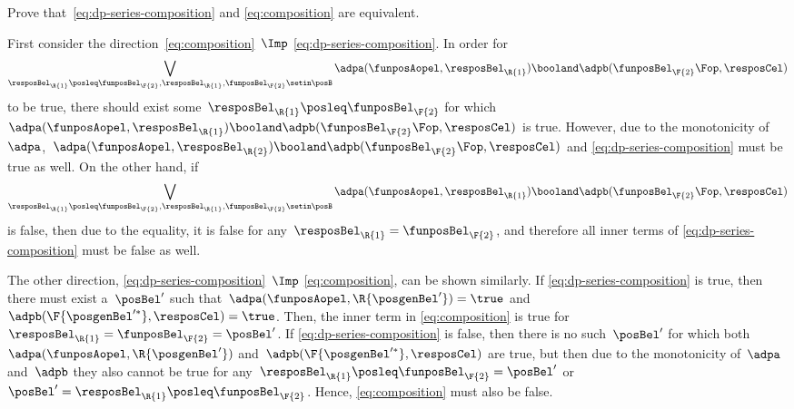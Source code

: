 \begin{exercise}
    \label{ex:composition_equivalency}
    Prove that~\cref{eq:dp-series-composition} and \cref{eq:composition} are equivalent.
\end{exercise}
%
\begin{solution}
    First consider the direction~\cref{eq:composition}~$\Imp$ \cref{eq:dp-series-composition}.
    In order for%
    \begin{equation}
        \bigvee_{\resposBel_\R{1}\posleq\funposBel_\F{2}, \resposBel_\R{1},\funposBel_\F{2}\setin \posB} \adpa(\funposAopel,\resposBel_\R{1}) \booland \adpb(\funposBel_\F{2}\Fop,\resposCel)%
    \end{equation}
    to be true, there should exist some~$\resposBel_\R{1}\posleq \funposBel_\F{2}$ for which~$\adpa(\funposAopel,\resposBel_\R{1}) \booland\adpb(\funposBel_\F{2}\Fop,\resposCel)$ is true.
    However, due to the monotonicity of~$\adpa$,~$\adpa(\funposAopel,\resposBel_\R{2}) \booland \adpb(\funposBel_\F{2}\Fop,\resposCel)$ and \cref{eq:dp-series-composition} must be true as well.
    On the other hand, if%
    \begin{equation}
        \bigvee_{\resposBel_\R{1}\posleq\funposBel_\F{2}, \resposBel_\R{1},\funposBel_\F{2}\setin \posB} \adpa(\funposAopel,\resposBel_\R{1}) \booland \adpb(\funposBel_\F{2}\Fop,\resposCel)%
    \end{equation}
    is false, then due to the equality, it is false for any~$\resposBel_\R{1}=\funposBel_\F{2}$, and therefore all inner terms of \cref{eq:dp-series-composition} must be false as well.

    The other direction, \cref{eq:dp-series-composition}~$\Imp$ \cref{eq:composition}, can be shown similarly.
    If \cref{eq:dp-series-composition} is true, then there must exist a~$\posBel'$ such that~$\adpa(\funposAopel, \R{\posgenBel'})=\true$ and~$\adpb(\F{\posgenBel'^*}, \resposCel)=\true$.
    Then, the inner term in \cref{eq:composition} is true for~$\resposBel_\R{1}=\funposBel_\F{2}=\posBel'$.
    If \cref{eq:dp-series-composition} is false, then there is no such~$\posBel'$ for which both~$\adpa(\funposAopel, \R{\posgenBel'})$ and~$\adpb(\F{\posgenBel'^*}, \resposCel)$ are true, but then due to the monotonicity of~$\adpa$ and~$\adpb$ they also cannot be true for any~$\resposBel_\R{1} \posleq \funposBel_\F{2} = \posBel'$ or~$\posBel'=\resposBel_\R{1} \posleq \funposBel_\F{2}$.
    Hence, \cref{eq:composition} must also be false.
\end{solution}

